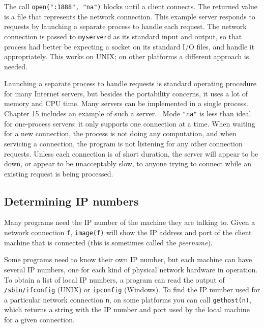 
The call \texttt{open(":1888",
"na")} blocks until a client connects.
The returned value is a file that represents the network connection.
This example server
responds to requests by launching a separate process to handle each
request. The network connection is passed to \texttt{myserverd} as its
standard input and output, so that process had better be expecting a
socket on its standard I/O files, and handle it appropriately.
This works on UNIX; on other platforms a different approach is needed.

Launching a separate process to handle requests is standard operating
procedure for many Internet servers, but besides the portability
concerns, it uses a lot of memory and CPU time. Many servers can be
implemented in a single process. Chapter 15 includes an example of such
a server. \ Mode \texttt{"na"} is less than
ideal for one-process servers: it only supports one connection at a
time. When waiting for a new connection, the process is not doing any
computation, and when servicing a connection, the program is not
listening for any other connection requests. Unless each connection is
of short duration, the server will appear to be down, or appear to be
unacceptably slow, to anyone trying to connect while an existing
request is being processed.

\subsection*{Determining IP numbers}

Many programs need the IP number of the machine they are talking to. Given a
network connection {\texttt f}, \texttt{image(f)} will show the
IP address and port of the client machine that is connected (this is sometimes
called the \textit{peername}).

Some programs need to know their own IP number, but each machine can have
several IP numbers, one for each kind of physical network hardware in operation.
To obtain a list of local IP numbers, a program can read the output of
\texttt{/sbin/ifconfig} (UNIX) or \texttt{ipconfig} (Windows). To find the IP
number used for a particular network connection \texttt{n}, on some platforms
you can call \texttt{gethost(n)}, which returns a string with the IP number and
port used by the local machine for a given connection.

